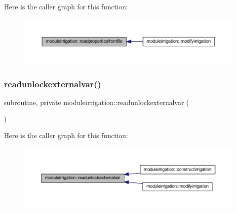 Here is the caller graph for this function\+:\nopagebreak
\begin{figure}[H]
\begin{center}
\leavevmode
\includegraphics[width=350pt]{namespacemoduleirrigation_ad1b1ec0e0230931e65e80ed64cb0fa86_icgraph}
\end{center}
\end{figure}
\mbox{\label{namespacemoduleirrigation_aec61adf79fc09c9fdc6f2f4a521e6549}} 
\subsubsection{\texorpdfstring{readunlockexternalvar()}{readunlockexternalvar()}}
{\footnotesize\ttfamily subroutine, private moduleirrigation\+::readunlockexternalvar (\begin{DoxyParamCaption}{ }\end{DoxyParamCaption})\hspace{0.3cm}{\ttfamily [private]}}

Here is the caller graph for this function\+:\nopagebreak
\begin{figure}[H]
\begin{center}
\leavevmode
\includegraphics[width=350pt]{namespacemoduleirrigation_aec61adf79fc09c9fdc6f2f4a521e6549_icgraph}
\end{center}
\end{figure}
\mbox{\label{namespacemoduleirrigation_afbdbea5850d2436e5bbe8f9fb8da65bd}} 
